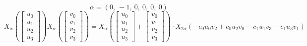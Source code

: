 \documentclass[11pt]{article}
\theoremstyle{definition}
\begin{document}
\[
\alpha = \left( 0, \  -1, \  0, \  0, \  0, \  0\right)
\]
\[
X_{\alpha}\left(\left[\begin{matrix}u_{0}\\u_{1}\\u_{2}\\u_{3}\end{matrix}\right]\right) X_{\alpha}\left(\left[\begin{matrix}v_{0}\\v_{1}\\v_{2}\\v_{3}\end{matrix}\right]\right) = X_{\alpha}\left(\left[\begin{matrix}u_{0}\\u_{1}\\u_{2}\\u_{3}\end{matrix}\right] + \left[\begin{matrix}v_{0}\\v_{1}\\v_{2}\\v_{3}\end{matrix}\right]\right) \cdot X_{2\alpha}\left(- c_{0} u_{0} v_{2} + c_{0} u_{2} v_{0} - c_{1} u_{1} v_{3} + c_{1} u_{3} v_{1}\right)
\]
\end{document}
